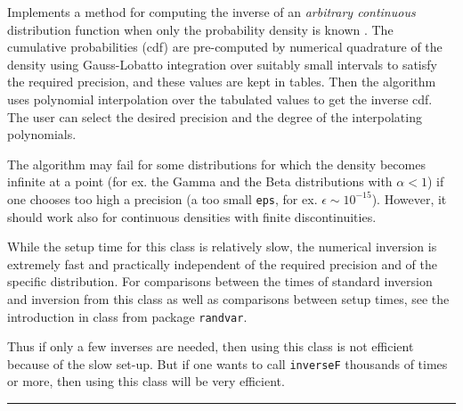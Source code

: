 
Implements a method for computing the  inverse of an \emph{arbitrary
continuous} distribution function when only the probability density
is known \cite{rDER09a}. The cumulative probabilities (cdf) are pre-computed by
 numerical quadrature  of the
density using Gauss-Lobatto integration over suitably small intervals to
satisfy the required precision, and these values are kept in tables. Then the
 algorithm uses polynomial interpolation  over the tabulated values to get
  the inverse cdf. The user can select the
  desired precision and the degree of the interpolating polynomials.

The algorithm may fail for some distributions for which the density
 becomes infinite at a point (for ex. the Gamma and the Beta distributions
 with $\alpha < 1$)  if one chooses too high a precision
(a  too small \texttt{eps}, for ex. $\epsilon \sim 10^{-15}$).
However, it should work also for continuous densities with finite discontinuities.


While the setup time for this class is relatively slow, the numerical inversion
 is extremely fast and practically independent of the required precision
and of the specific distribution. For comparisons between the times
of standard inversion and inversion from this class as well as
comparisons between  setup times, see the introduction in class
from package \texttt{randvar}.

Thus if only a few inverses are needed, then using this class
 is not efficient because of the slow set-up. But if one wants to call
 \texttt{inverseF} thousands of times or more, then using this class will
be very efficient.

\bigskip\hrule

